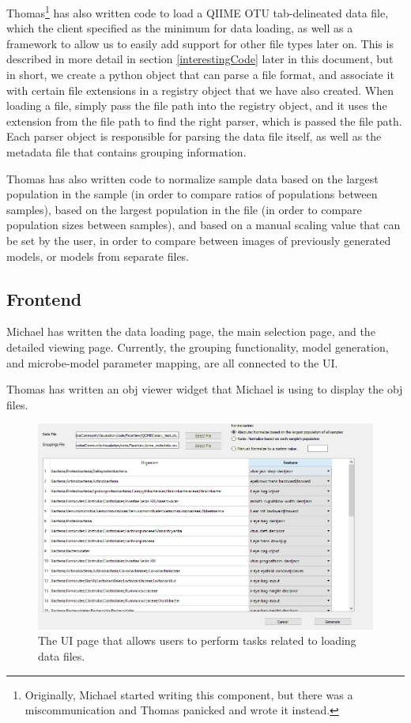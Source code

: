 \documentclass[letterpaper,10pt, onecolumn, draftclsnofoot]{IEEEtran}
\begin{document}
Thomas\footnote{Originally, Michael started writing this component, but there was a miscommunication and Thomas panicked and wrote it instead.} has also written code to load a QIIME OTU tab-delineated data file, which the client specified as the minimum for data loading, as well as a framework to allow us to easily add support for other file types later on. This is described in more detail in section \ref{interestingCode} later in this document, but in short, we create a python object that can parse a file format, and associate it with certain file extensions in a registry object that we have also created. When loading a file, simply pass the file path into the registry object, and it uses the extension from the file path to find the right parser, which is passed the file path. Each parser object is responsible for parsing the data file itself, as well as the metadata file that contains grouping information.

Thomas has also written code to normalize sample data based on the largest population in the sample (in order to compare ratios of populations between samples), based on the largest population in the file (in order to compare population sizes between samples), and based on a manual scaling value that can be set by the user, in order to compare between images of previously generated models, or models from separate files.

\subsection{Frontend}

Michael has written the data loading page, the main selection page, and the detailed viewing page. Currently, the grouping functionality, model generation, and microbe-model parameter mapping, are all connected to the UI.

Thomas has written an obj viewer widget that Michael is using to display the obj files.

\begin{figure}
	\includegraphics[width=\textwidth]{loading.PNG}
	\caption{The UI page that allows users to perform tasks related to loading data files.}
	\label{fig:LoadingInterface}
\end{figure}
\end{document}
